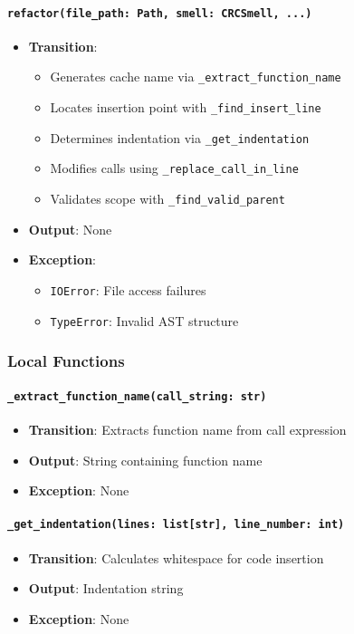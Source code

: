 \documentclass[12pt, titlepage]{article}
\begin{document}
\paragraph{\texttt{refactor(file\_path: Path, smell: CRCSmell, ...)}}
\begin{itemize}
\item \textbf{Transition}:
\begin{itemize}
\item Generates cache name via \texttt{\_extract\_function\_name}
\item Locates insertion point with \texttt{\_find\_insert\_line}
\item Determines indentation via \texttt{\_get\_indentation}
\item Modifies calls using \texttt{\_replace\_call\_in\_line}
\item Validates scope with \texttt{\_find\_valid\_parent}
\end{itemize}
\item \textbf{Output}: None
\item \textbf{Exception}:
\begin{itemize}
\item \texttt{IOError}: File access failures
\item \texttt{TypeError}: Invalid AST structure
\end{itemize}
\end{itemize}

\subsubsection{Local Functions}

\paragraph{\texttt{\_extract\_function\_name(call\_string: str)}}
\begin{itemize}
  \item \textbf{Transition}: Extracts function name from call expression
  \item \textbf{Output}: String containing function name
  \item \textbf{Exception}: None
\end{itemize}

\paragraph{\texttt{\_get\_indentation(lines: list[str], line\_number: int)}}
\begin{itemize}
  \item \textbf{Transition}: Calculates whitespace for code insertion
  \item \textbf{Output}: Indentation string
  \item \textbf{Exception}: None
\end{itemize}
\end{document}
